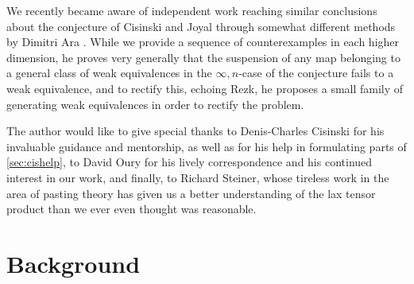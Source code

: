 \documentclass{amsbook}
\theoremstyle{plain}   %
\theoremstyle{remark}
\theoremstyle{plain}
\numberwithin{section}{chapter}
\begin{document}
We recently became aware of independent work reaching similar conclusions about the conjecture of Cisinski and Joyal through somewhat different methods by Dimitri Ara \cite{ara-new}.  While we provide a sequence of counterexamples in each higher dimension, he proves very generally that the suspension of any map belonging to a general class of weak equivalences in the \(\infty,n\)-case of the conjecture fails to a weak equivalence, and to rectify this, echoing Rezk, he proposes a small family of generating weak equivalences in order to rectify the problem.  

The author would like to give special thanks to Denis-Charles Cisinski for his invaluable guidance and mentorship, as well as for his help in formulating parts of \eqref{sec:cishelp}, to David Oury for his lively correspondence and his continued interest in our work, and finally, to Richard Steiner, whose tireless work in the area of pasting theory has given us a better understanding of the lax tensor product than we ever even thought was reasonable.  


\mainmatter
\chapter{Background}

%
\end{document}
